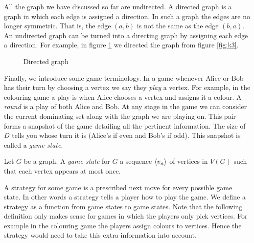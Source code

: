 All the graph we have discussed so far are undirected. A directed graph is a graph in which each edge is assigned a direction. In such a graph the edges are no longer symmetric. That is, the edge $(a,b)$ is not the same as the edge $(b,a)$. An undirected graph can be turned into a directing graph by assigning each edge a direction. For example, in figure \ref{fig:directed_graph} we directed the graph from figure \ref{fig:k3}. %
\begin{figure}[h]
    \centering
    \caption{Directed graph}
    \label{fig:directed_graph}
\end{figure}
   
Finally, we introduce some game terminology. In a game whenever Alice or Bob has their turn by choosing a vertex we say they \textit{play} a vertex. For example, in the colouring game a play is when Alice chooses a vertex and assigns it a colour. A \textit{round} is a play of both Alice and Bob.  At any stage in the game we can consider the current dominating set along with the graph we are playing on. This pair forms a snapshot of the game detailing all the pertinent information. The size of $D$ tells you whose turn it is (Alice's if even and Bob's if odd). This snapshot is called a \textit{game state}. 

\begin{definition}
    Let $G$ be a graph. A \textit{game state} for $G$ a sequence $\left\langle v_n \right\rangle$ of vertices in $V(G)$ such that each vertex appears at most once.
\end{definition}

A strategy for some game is a prescribed next move for every possible game state. In other words a strategy tells a player how to play the game. We define a strategy as a function from game states to game states. Note that the following definition only makes sense for games in which the players only pick vertices. For example in the colouring game the players assign colours to vertices. Hence the strategy would need to take this extra information into account. 

